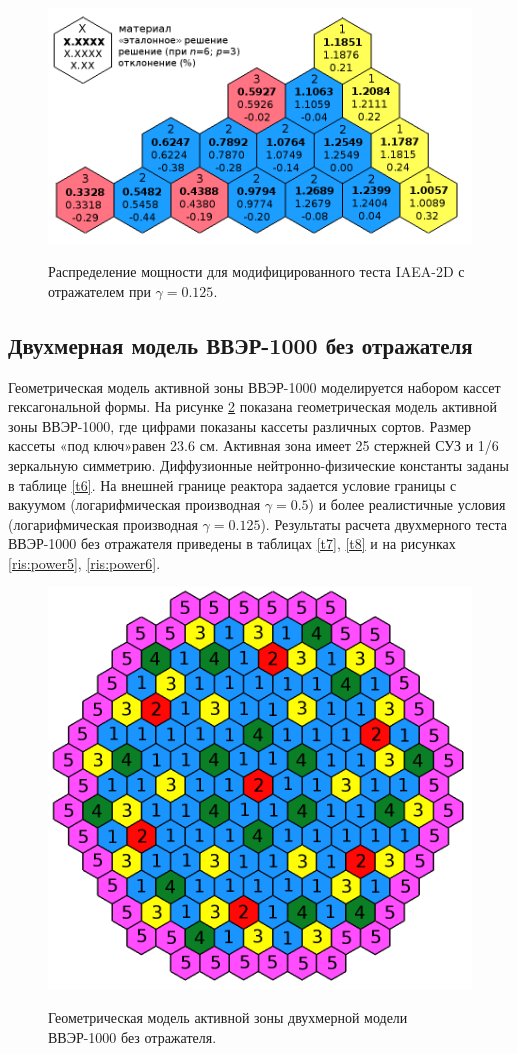 \begin{figure}[H]
	\includegraphics[width=0.85\linewidth]{power_iaea_ref_0125_6_3.png}\\
	\caption{\label{image:canonsummary}Распределение мощности для модифицированного теста IAEA-2D с отражателем при $\gamma=0.125$.}
	\label{ris:power4}
\end{figure}

\subsection{Двухмерная модель ВВЭР-1000 без отражателя}
\label{s-4-3}
Геометрическая модель активной зоны ВВЭР-1000 моделируется набором кассет гексагональной формы. На рисунке \ref{ris:vver1000} показана геометрическая модель активной зоны ВВЭР-1000, где цифрами показаны кассеты различных сортов.
Размер кассеты «под ключ»\;равен 23.6 см. Активная зона имеет 25 стержней СУЗ и 1/6 зеркальную симметрию. Диффузионные нейтронно-физические константы заданы  в таблице \ref{t6}. На внешней границе реактора задается условие границы с вакуумом (логарифмическая производная  $\gamma = 0.5$) и более реалистичные условия (логарифмическая производная  $\gamma = 0.125$). Результаты расчета двухмерного теста ВВЭР-1000 без отражателя приведены в таблицах \ref{t7}, \ref{t8} и на рисунках \ref{ris:power5}, \ref{ris:power6}.
\begin{figure}[H]
	\includegraphics[width=0.75\linewidth]{vver.png}\\
	\caption{\label{image:canonsummary}Геометрическая модель активной зоны двухмерной модели ВВЭР-1000 без отражателя.}
	\label{ris:vver1000}
\end{figure}

